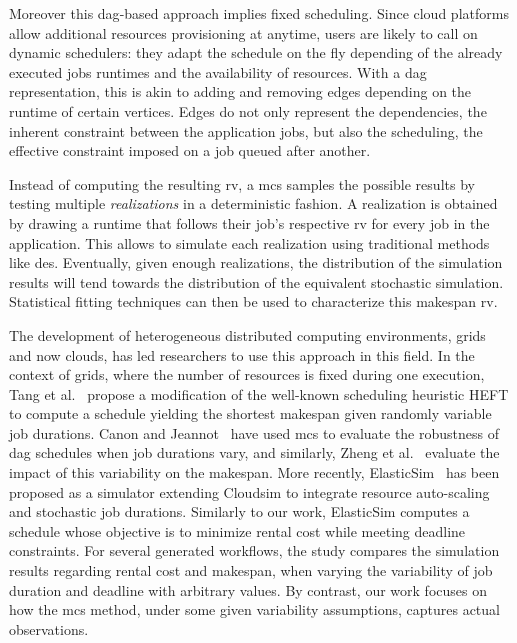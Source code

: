 \documentclass[10pt,conference,compsocconf]{IEEEtran}
\begin{document}
Moreover this \ac{dag}-based approach implies fixed scheduling. 
Since cloud platforms allow additional resources provisioning at anytime,
users are likely to call on dynamic schedulers: they adapt the schedule on the fly
depending of the already executed jobs runtimes and the availability of
resources. With a \ac{dag} representation, this is akin to adding
and removing edges depending on the runtime of certain vertices. Edges do not
only represent the dependencies, the inherent constraint between the application
jobs, but also the scheduling, the effective constraint imposed on a job queued
after another.


Instead  of computing  the resulting  \ac{rv}, a  \ac{mcs} samples  the possible
results by testing  multiple \emph{realizations} in a  deterministic fashion.  A
realization is obtained by drawing a runtime that follows their job's respective 
\ac{rv} for  every job in the  application. 
This allows to simulate each realization using traditional
methods like \ac{des}.  Eventually, given enough realizations, the distribution of
the simulation  results will  tend towards the  distribution of  the equivalent
stochastic  simulation.  Statistical  fitting  techniques can  then  be used  to
characterize this makespan \ac{rv}.

The development  of heterogeneous distributed computing  environments, grids and
now clouds,  has led  researchers to use  this approach in  this field.   In the
context of grids,  where the number of resources is  fixed during one execution,
Tang et  al.~\cite{Tang11} propose a  modification of the  well-known scheduling
heuristic  HEFT to  compute  a  schedule yielding  the  shortest makespan  given
randomly  variable job  durations. Canon and Jeannot~\cite{Canon10} have used  \ac{mcs} to
evaluate  the robustness  of \ac{dag}  schedules when  job durations  vary, and
similarly, Zheng et  al.~\cite{Zheng13} evaluate the impact  of this variability
on the makespan. More  recently, ElasticSim~\cite{Cai17} has been  proposed as a
simulator extending  Cloudsim to integrate resource  auto-scaling and stochastic
job  durations. Similarly  to our  work, ElasticSim  computes a  schedule whose
objective  is  to  minimize  rental  cost while meeting deadline
constraints.  For  several  generated workflows, the  study compares the  simulation results regarding  rental cost
and makespan,  when varying the variability  of job duration and  deadline with
arbitrary  values.  By  contrast,  our  work
focuses on how the \ac{mcs} method, under some given variability assumptions, 
captures actual observations.
\end{document}

